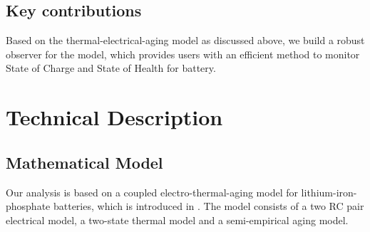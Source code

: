\documentclass[12pt]{article}
\begin{document}
\subsection*{Key contributions} 

Based on the thermal-electrical-aging model as discussed above, we build a robust observer for the model, which provides users with an efficient method to monitor State of Charge and State of Health for battery.


\section{Technical Description}
\subsection{Mathematical Model}
Our analysis is based on a coupled electro-thermal-aging model for lithium-iron-phosphate batteries, which is introduced in \cite{ref:1}. 
The model consists of a two RC pair electrical model, a two-state thermal model and a semi-empirical aging model.
\end{document}
